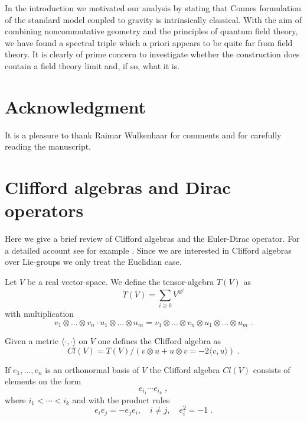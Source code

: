 \documentclass[12pt]{article}
\begin{document}
In the introduction we motivated our analysis by stating that Connes
formulation of the standard model coupled to gravity is intrinsically classical. With the aim of
combining noncommutative geometry and the principles of quantum field theory,
we have found a spectral triple which a priori appears to be quite far from field
theory. It is clearly of prime concern to investigate whether the construction
does contain a field theory limit and, if so, what it is.



\section{Acknowledgment}

It is a pleasure to thank Raimar Wulkenhaar for comments and for carefully reading the manuscript.







 

  






\appendix




\section{Clifford algebras and Dirac operators}
\label{diracappendix}


Here we give a brief review of Clifford algebras and the Euler-Dirac
operator. For a detailed account see for example \cite{spingeometri}.
Since we are interested in Clifford algebras over Lie-groups we only treat the
Euclidian case.

Let $V$ be a real vector-space. We define the tensor-algebra $T(V)$ as
$$T(V)=\sum_{i\geq 0} V^{\otimes^i}$$
with multiplication 
$$v_1\otimes \ldots \otimes v_n \cdot u_1\otimes \ldots \otimes u_m =v_1\otimes \ldots \otimes v_n \otimes u_1 \otimes \ldots \otimes u_m\;.$$

Given a metric $\langle\cdot , \cdot \rangle$ on $V$ one defines the Clifford algebra as
$$Cl(V)=T(V)/(v\otimes u+u\otimes v =-2\langle v,u\rangle )\;.$$ 

If $e_1,\ldots , e_n$ is an orthonormal basis of $V$ the Clifford algebra $Cl(V)$ consists of elements on the form  
$$e_{i_1}\cdots e_{i_k}\;,$$
where $i_1< \cdots <i_k$ and with the product rules
$$e_ie_j=-e_je_i, \quad i\not= j , \quad e_i^2=-1\;.$$ 
\end{document}

